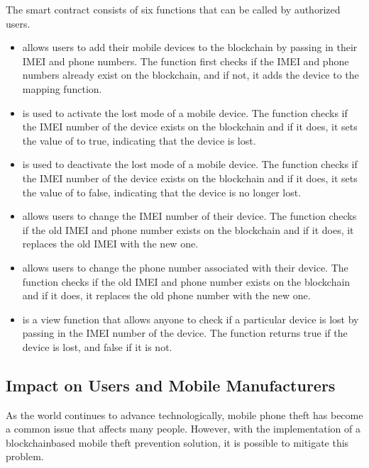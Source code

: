 \documentclass[letterpaper,10pt,english]{jupyterBook}
\begin{document}
\sphinxAtStartPar
The smart contract consists of six functions that can be called by authorized users.
\begin{itemize}
\item {} 
\sphinxAtStartPar
{}  allows users to add their mobile devices to the blockchain by passing in their IMEI and phone numbers. The function first checks if the IMEI and phone numbers already exist on the blockchain, and if not, it adds the device to the mapping function.

\item {} 
\sphinxAtStartPar
{}  is used to activate the lost mode of a mobile device. The function checks if the IMEI number of the device exists on the blockchain and if it does, it sets the value of   to true, indicating that the device is lost.

\item {} 
\sphinxAtStartPar
{} is used to deactivate the lost mode of a mobile device. The function checks if the IMEI number of the device exists on the blockchain and if it does, it sets the value of  to false, indicating that the device is no longer lost.

\item {} 
\sphinxAtStartPar
{} allows users to change the IMEI number of their device. The function checks if the old IMEI and phone number exists on the blockchain and if it does, it replaces the old IMEI with the new one.

\item {} 
\sphinxAtStartPar
{} allows users to change the phone number associated with their device. The function checks if the old IMEI and phone number exists on the blockchain and if it does, it replaces the old phone number with the new one.

\item {} 
\sphinxAtStartPar
{} is a view function that allows anyone to check if a particular device is lost by passing in the IMEI number of the device. The function returns true if the device is lost, and false if it is not.

\end{itemize}


\subsection{Impact on Users and Mobile Manufacturers}
\label{\detokenize{MTP/mtp:impact-on-users-and-mobile-manufacturers}}
\sphinxAtStartPar
As the world continues to advance technologically, mobile phone theft has become a common issue that affects many people. However, with the implementation of a blockchain\sphinxhyphen{}based mobile theft prevention solution, it is possible to mitigate this problem.
\end{document}
